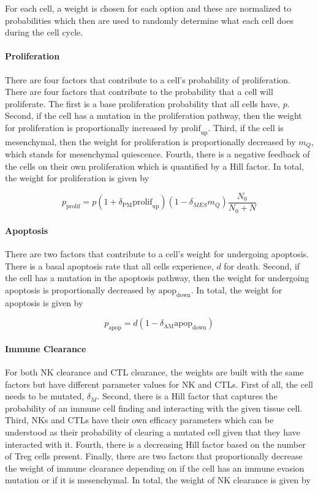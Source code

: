 \documentclass{article}
\begin{document}
For each cell, a weight is chosen for each option and these are normalized to probabilities which then are used to randomly determine what each cell does during the cell cycle.

\paragraph{Proliferation}
There are four factors that contribute to a cell's probability of proliferation.
There are four factors that contribute to the probability that a cell will proliferate.
% 
The first is a base proliferation probability that all cells have, $p$.
Second, if the cell has a mutation in the proliferation pathway, then the weight for proliferation is proportionally increased by $\text{prolif}_{\text{up}}$.
Third, if the cell is mesenchymal, then the weight for proliferation is proportionally decreased by $m_Q$, which stands for mesenchymal quiescence.
Fourth, there is a negative feedback of the cells on their own proliferation which is quantified by a Hill factor.
In total, the weight for proliferation is given by

$$ p_{\text{prolif}} = p(1+\delta_{\text{PM}}\text{prolif}_{\text{up}})(1-\delta_{MES}m_Q)\frac{N_0}{N_0+N} $$

\paragraph{Apoptosis}
There are two factors that contribute to a cell's weight for undergoing apoptosis.
There is a basal apoptosis rate that all cells experience, $d$ for death.
Second, if the cell has a mutation in the apoptosis pathway, then the weight for undergoing apoptosis is proportionally decreased by $\text{apop}_{\text{down}}$.
In total, the weight for apoptosis is given by 

$$ p_{\text{apop}} = d(1-\delta_{\text{AM}}\text{apop}_{\text{down}}) $$

\paragraph{Immune Clearance}
For both NK clearance and CTL clearance, the weights are built with the same factors but have different parameter values for NK and CTLs.
First of all, the cell needs to be mutated, $\delta_M$.
Second, there is a Hill factor that captures the probability of an immune cell finding and interacting with the given tissue cell.
Third, NKs and CTLs have their own efficacy parameters which can be understood as their probability of clearing a mutated cell given that they have interacted with it.
Fourth, there is a decreasing Hill factor based on the number of Treg cells present.
Finally, there are two factors that proportionally decrease the weight of immune clearance depending on if the cell has an immune evasion mutation or if it is mesenchymal.
In total, the weight of NK clearance is given by
\end{document}
